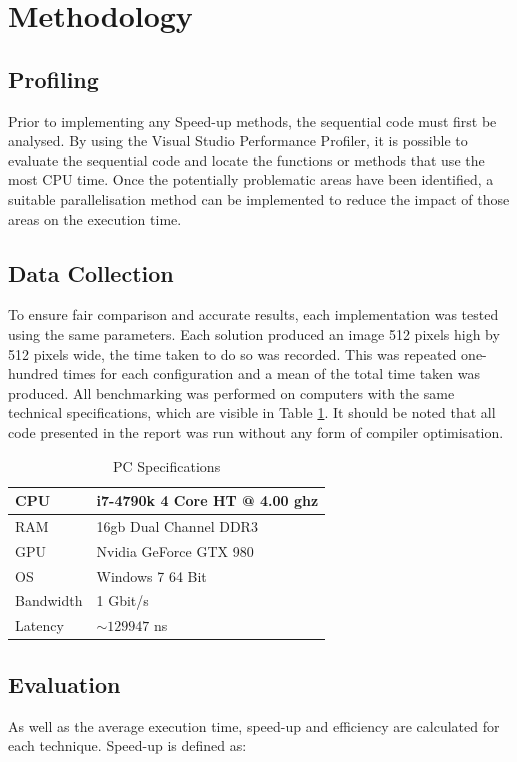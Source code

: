 \documentclass[journal,transmag]{IEEEtran}
\begin{document}
\section{Methodology}
		
	\subsection{Profiling}
		Prior to implementing any Speed-up methods, the sequential code must first be analysed. By using the Visual Studio Performance Profiler, it is possible to evaluate the sequential code and locate the functions or methods that use the most CPU time. Once the potentially problematic areas have been identified, a suitable parallelisation method can be implemented to reduce the impact of those areas on the execution time. 
		
	\subsection{Data Collection}
		To ensure fair comparison and accurate results, each implementation was tested using the same parameters. Each solution produced an image 512 pixels high by 512 pixels wide, the time taken to do so was recorded. This was repeated one-hundred times for each configuration and a mean of the total time taken was produced. All benchmarking was performed on computers with the same technical specifications, which are visible in Table \ref{pcSpecsTable}. It should be noted that all code presented in the report was run without any form of compiler optimisation.
		
		\begin{table}[]
		\centering
		\caption{PC Specifications}
		\label{pcSpecsTable}
			\begin{tabular}{|l|l|}
				\hline
				CPU & i7-4790k 4 Core HT @ 4.00 ghz \\ \hline
				RAM & 16gb Dual Channel DDR3        \\ \hline
				GPU & Nvidia GeForce GTX 980        \\ \hline
				OS  & Windows 7 64 Bit              \\ \hline
				Bandwidth & 1 Gbit/s  				\\ \hline
				Latency   & $\sim129947$ ns 		\\ \hline
			\end{tabular}
		\end{table}
		
	\subsection{Evaluation}
		As well as the average execution time, speed-up and efficiency are calculated for each technique. Speed-up is defined as: 
		
\end{document}
